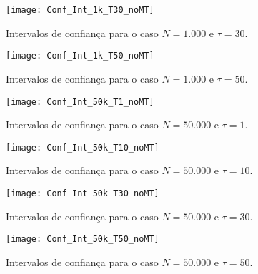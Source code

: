 \begin{figure}
	\centering
	\texttt{[image: Conf\_Int\_1k\_T30\_noMT]}
	\caption{Intervalos de confiança para o caso $N=1.000$ e $\tau=30$.}\label{Fig:Conf_Int_1k_30}
\end{figure}

\begin{figure}
	\centering
	\texttt{[image: Conf\_Int\_1k\_T50\_noMT]}
	\caption{Intervalos de confiança para o caso $N=1.000$ e $\tau=50$.}\label{Fig:Conf_Int_1k_T50}
\end{figure}

\begin{figure}
	\centering
	\texttt{[image: Conf\_Int\_50k\_T1\_noMT]}
	\caption{Intervalos de confiança para o caso $N=50.000$ e $\tau=1$.}\label{Fig:Conf_Int_50k_T1}
\end{figure}

\begin{figure}
	\centering
	\texttt{[image: Conf\_Int\_50k\_T10\_noMT]}
	\caption{Intervalos de confiança para o caso $N=50.000$ e $\tau=10$.}\label{Fig:Conf_Int_50k_T10}
\end{figure}

\begin{figure}
	\centering
	\texttt{[image: Conf\_Int\_50k\_T30\_noMT]}
	\caption{Intervalos de confiança para o caso $N=50.000$ e $\tau=30$.}\label{Fig:Conf_Int_50k_30}
\end{figure}

\begin{figure}
	\centering
	\texttt{[image: Conf\_Int\_50k\_T50\_noMT]}
	\caption{Intervalos de confiança para o caso $N=50.000$ e $\tau=50$.}\label{Fig:Conf_Int_50k_T50}
\end{figure}


\begin{center}
\end{center}

